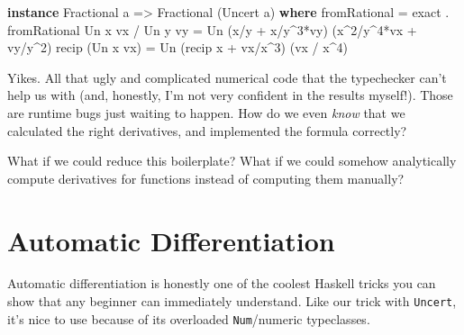 \documentclass[]{article}
\newenvironment{Shaded}{}{}
\newcommand{\DataTypeTok}[1]{\textcolor[rgb]{0.56,0.13,0.00}{#1}}
\newcommand{\DecValTok}[1]{\textcolor[rgb]{0.25,0.63,0.44}{#1}}
\newcommand{\FunctionTok}[1]{\textcolor[rgb]{0.02,0.16,0.49}{#1}}
\newcommand{\KeywordTok}[1]{\textcolor[rgb]{0.00,0.44,0.13}{\textbf{#1}}}
\newcommand{\NormalTok}[1]{#1}
\newcommand{\OtherTok}[1]{\textcolor[rgb]{0.00,0.44,0.13}{#1}}
\begin{document}
\begin{Shaded}
\begin{Highlighting}[]
\KeywordTok{instance} \DataTypeTok{Fractional}\NormalTok{ a }\OtherTok{=>} \DataTypeTok{Fractional}\NormalTok{ (}\DataTypeTok{Uncert}\NormalTok{ a) }\KeywordTok{where}
\NormalTok{    fromRational      }\FunctionTok{=}\NormalTok{ exact }\FunctionTok{.}\NormalTok{ fromRational}
    \DataTypeTok{Un}\NormalTok{ x vx }\FunctionTok{/} \DataTypeTok{Un}\NormalTok{ y vy }\FunctionTok{=} \DataTypeTok{Un}\NormalTok{ (x}\FunctionTok{/}\NormalTok{y }\FunctionTok{+}\NormalTok{ x}\FunctionTok{/}\NormalTok{y}\FunctionTok{^}\DecValTok{3}\FunctionTok{*}\NormalTok{vy)   (x}\FunctionTok{^}\DecValTok{2}\FunctionTok{/}\NormalTok{y}\FunctionTok{^}\DecValTok{4}\FunctionTok{*}\NormalTok{vx }\FunctionTok{+}\NormalTok{ vy}\FunctionTok{/}\NormalTok{y}\FunctionTok{^}\DecValTok{2}\NormalTok{)}
\NormalTok{    recip (}\DataTypeTok{Un}\NormalTok{ x vx)   }\FunctionTok{=} \DataTypeTok{Un}\NormalTok{ (recip x }\FunctionTok{+}\NormalTok{ vx}\FunctionTok{/}\NormalTok{x}\FunctionTok{^}\DecValTok{3}\NormalTok{) (vx }\FunctionTok{/}\NormalTok{ x}\FunctionTok{^}\DecValTok{4}\NormalTok{)}
\end{Highlighting}
\end{Shaded}

Yikes. All that ugly and complicated numerical code that the typechecker can't
help us with (and, honestly, I'm not very confident in the results myself!).
Those are runtime bugs just waiting to happen. How do we even \emph{know} that
we calculated the right derivatives, and implemented the formula correctly?

What if we could reduce this boilerplate? What if we could somehow analytically
compute derivatives for functions instead of computing them manually?

\hypertarget{automatic-differentiation}{%
\section{Automatic Differentiation}\label{automatic-differentiation}}

Automatic differentiation is honestly one of the coolest Haskell tricks you can
show that any beginner can immediately understand. Like our trick with
\texttt{Uncert}, it's nice to use because of its overloaded \texttt{Num}/numeric
typeclasses.
\end{document}
